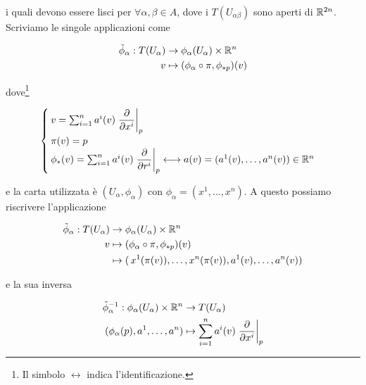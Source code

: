 i quali devono essere lisci per $ \forall \alpha,\beta \in A $, dove i $ T(U_{\alpha \beta}) $ sono aperti di $ \mathbb{R}^{2n} $.\\
Scriviamo le singole applicazioni come

\begin{align}
	\begin{split}
		\tilde{\phi}_{\alpha} : T(U_{\alpha}) &\to \phi_{\alpha}(U_{\alpha}) \times \mathbb{R}^{n}\\
		v &\mapsto (\phi_{\alpha} \circ \pi, \phi_{*p})(v)
	\end{split}
\end{align}

dove\footnote{%
Il simbolo $ \longleftrightarrow $ indica l'identificazione.%
}

\begin{equation}
	\begin{cases}
		v = \sum_{i=1}^{n} a^{i}(v) \left. \dfrac{\partial}{\partial x^{i}} \right|_{p}\\
		\pi(v) = p\\
		\phi_{*}(v) = \sum_{i=1}^{n} a^{i}(v) \left. \dfrac{\partial}{\partial r^{i}} \right|_{p} \longleftrightarrow a(v) = (a^{1}(v),\dots,a^{n}(v)) \in \mathbb{R}^{n}
	\end{cases}	
\end{equation}

e la carta utilizzata è $ (U_{\alpha},\phi_{\alpha}) $ con $ \phi_{\alpha} = (x^{1},\dots,x^{n}) $. A questo possiamo riscrivere l'applicazione

\begin{align}
	\begin{split}
		\tilde{\phi}_{\alpha} : T(U_{\alpha}) &\to \phi_{\alpha}(U_{\alpha}) \times \mathbb{R}^{n}\\
		v &\mapsto (\phi_{\alpha} \circ \pi, \phi_{*p})(v)\\
		&\mapsto ( \, x^{1}(\pi(v)),\dots,x^{n}(\pi(v)), a^{1}(v),\dots,a^{n}(v))
	\end{split}
\end{align}

e la sua inversa

\begin{align}
	\begin{split}
		\tilde{\phi}_{\alpha}^{-1} : \phi_{\alpha}(U_{\alpha}) \times \mathbb{R}^{n} &\to T(U_{\alpha})\\
		(\phi_{\alpha}(p), a^{1},\dots,a^{n}) &\mapsto \sum_{i=1}^{n} a^{i}(v) \left. \dfrac{\partial}{\partial x^{i}} \right|_{p}
	\end{split}
\end{align}

